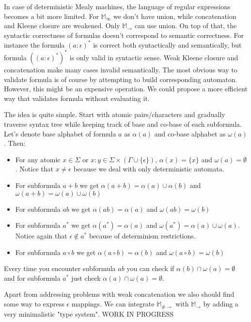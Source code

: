\documentclass[12pt]{article}
\begin{document}
In case of deterministic Mealy machines, the language of regular expressions becomes a bit more limited. For $\mathbb{M}_\infty$ we don't have union, while  concatenation and Kleene closure are weakened. Only $\mathbb{M}_\rightarrow$ can use union. On top of that, the syntactic correctness of formulas doesn't correspond to semantic correctness. For instance the formula $(a:\epsilon)^*$ is correct both syntactically and semantically, but formula $((a:\epsilon)^*)^*$ is only valid in syntactic sense. Weak Kleene closure and concatenation make many cases invalid semantically. The most obvious way to validate formula is of course by attempting to build corresponding automaton. However, this might be an expensive operation. We could propose a more efficient way that validates formula without evaluating it.

The idea is quite simple. Start with atomic pairs/characters and gradually traverse syntax tree while keeping track of base and co-base of each subformula. Let's denote base alphabet of formula $a$ as $\alpha(a)$ and co-base alphabet as $\omega(a)$. Then:
\begin{itemize}
	\item For any atomic $x\in\Sigma$ or $x:y\in\Sigma\times(\Gamma\cup\{\epsilon\})$, $\alpha(x) = \{x\}$ and $ \omega(a) = \emptyset$. Notice that $x\ne\epsilon$ because we deal with only deterministic automata.
	\item For subformula $a+b$ we get $\alpha(a+b) = \alpha(a) \cup \alpha(b) $ and $\omega(a+b) = \omega(a) \cup \omega(b) $
	\item For subformula $ab$ we get $\alpha(ab) = \alpha(a) $ and $\omega(ab) = \omega(b) $
	\item For subformula $a^*$ we get $\alpha(a^*) = \alpha(a)$ and $\omega(a^*) =   \alpha(a) \cup \omega(a) $. Notice again that $\epsilon \notin a^*$ because of determinism restrictions.
	\item For subformula $a\circ b$ we get $\alpha(a\circ b) = \alpha(b) $ and $\omega(a\circ b) = \omega(b) $
\end{itemize}
Every time you encounter subformula $ab$ you can check if $\alpha(b)\cap\omega(a)=\emptyset$ and for subformula $a^*$ just check $\alpha(a)\cap\omega(a)=\emptyset$. 

Apart from addressing problems with weak concatenation we also should find some way to express $\epsilon$ mappings. We can integrate $\mathbb{ M}_{\#\rightarrow}$  with $\mathbb{ M}_\rightarrow$ by adding a very minimalistic "type system". WORK IN PROGRESS
\end{document}
